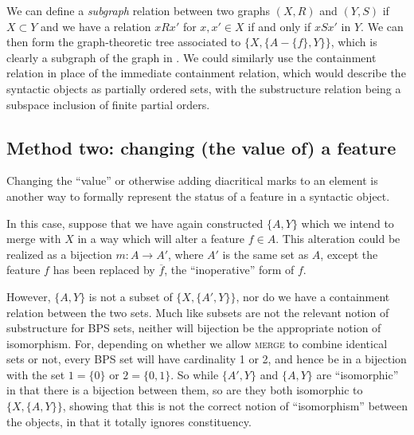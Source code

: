 \documentclass[output=paper]{langsci/langscibook}
\begin{document}
We can define a \emph{subgraph} relation between two graphs $(X,R)$ and $(Y,S)$
if $X\subset Y$ and we have a relation $xRx'$ for $x,x'\in X$ if
and only if $xSx'$ in $Y$. We can then form the graph-theoretic tree
associated to $\{X,\{A-\{f\},Y\}\}$, which is clearly a subgraph of the graph
in . We could similarly use the containment relation in
place of the immediate containment relation, which would describe the syntactic
objects as partially ordered sets, with the substructure relation being a
subspace inclusion of finite partial orders.

\subsection{Method two: changing (the value of) a feature}

Changing the \enquote{value} or otherwise adding diacritical marks to an element is
another way to formally represent the status of a feature in a syntactic
object.

In this case, suppose that we have again constructed $\{A,Y\}$ which we intend
to merge with $X$ in a way which will alter a feature $f\in A$. This
alteration could be realized as a bijection $m:A\rightarrow A'$, where $A'$ is
the same set as $A$, except the feature $f$ has been replaced by
$\overline{f}$, the ``inoperative'' form of $f$.

However, $\{A,Y\}$ is not a subset of $\{X,\{A',Y\}\}$, nor do we have a
containment relation between the two sets. Much like subsets are not the
relevant notion of substructure for \gls{BPS} sets, neither will bijection be
the appropriate notion of isomorphism. For, depending on whether we allow
\textsc{merge} to combine identical sets or not, every \gls{BPS} set will have
cardinality 1 or 2, and hence be in a bijection with the set $1=\{0\}$ or
$2=\{0,1\}$. So while $\{A',Y\}$ and $\{A,Y\}$ are \enquote{isomorphic} in that there
is a bijection between them, so are they both isomorphic to $\{X,\{A,Y\}\}$,
showing that this is not the correct notion of \enquote{isomorphism} between the
objects, in that it totally ignores constituency.
\end{document}
